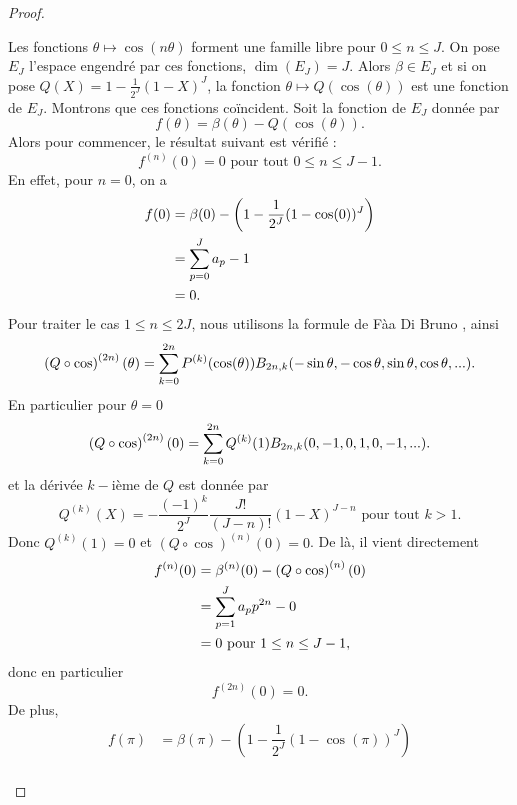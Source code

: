 \begin{proof}
\begin{itemize}
Les fonctions $\theta \mapsto \cos (n \theta)$ forment une famille libre pour $0 \leq n \leq J$. On pose $E_J$ l'espace engendré par ces fonctions, $\dim (E_J) = J$. Alors $\beta \in E_J$ et si on pose $Q(X)= 1 - \frac{1}{2^J}(1-X)^J$, la fonction $\theta \mapsto Q(\cos(\theta))$ est une fonction de $E_J$. Montrons que ces fonctions coïncident.
Soit la fonction de $E_J$ donnée par
\begin{equation}
f(\theta) = \beta(\theta) - Q(\cos (\theta)).
\end{equation}
Alors pour commencer, le résultat suivant est vérifié :
\begin{equation}
f^{(n)}(0) = 0 \text{ pour tout } 0 \leq n \leq J-1.
\end{equation}
En effet, pour $n=0$, on a
\begin{align*}
f(0) & = \beta(0) - \left( 1-\dfrac{1}{2^J}(1 - \cos (0))^J \right) \\
	& = \displaystyle\sum\limits_{p=0}^J a_p - 1 \\
	& = 0.
\end{align*}
Pour traiter le cas $1 \leq n \leq 2J$, nous utilisons la formule de Fàa Di Bruno \cite{Comtet2012}, ainsi
\begin{equation}
\left( Q \circ \cos \right)^{(2n)}(\theta) = \displaystyle\sum\limits_{k=0}^{2n} P^{(k)}(\cos(\theta)) B_{2n,k}(-\sin \theta, - \cos \theta, \sin \theta, \cos \theta, ...).
\end{equation}
En particulier pour $\theta = 0$
\begin{equation}
\left( Q \circ \cos \right)^{(2n)}(0) = \displaystyle\sum\limits_{k=0}^{2n} Q^{(k)}(1) B_{2n,k}(0, -1, 0, 1, 0, -1, ...).
\end{equation}
et la dérivée $k-$ième de $Q$ est donnée par
\begin{equation}
Q^{(k)}(X) = - \dfrac{(-1)^k}{2^J} \dfrac{J!}{(J-n)!}(1-X)^{J-n} \text{ pour tout } k>1.
\end{equation}
Donc $Q^{(k)}(1)=0$ et $\left( Q \circ \cos \right)^{(n)}(0) =0$. De là, il vient directement
\begin{align*}
f^{(n)}(0) & = \beta^{(n)}(0) - \left( Q \circ \cos \right)^{(n)}(0) \\
	& = \displaystyle\sum\limits_{p=1}^J a_p p^{2n} - 0 \\
	& = 0 \text{ pour } 1 \leq n \leq J-1,
\end{align*}
donc en particulier
\begin{equation}
f^{(2n)}(0)=0.
\end{equation}
De plus,
\begin{align*}
f(\pi) & = \beta(\pi) - \left( 1-\dfrac{1}{2^J}(1 - \cos (\pi))^J \right) \\

\end{align*}
\end{itemize}
\end{proof}
